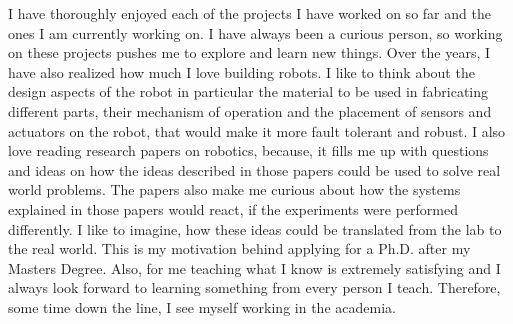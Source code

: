 \documentclass[10pt]{article}
\newcommand{\statement}[1]{\par\medskip
  \textcolor{blue}{\textbf{#1:}}\space
}
\begin{document}
\par
I have thoroughly enjoyed each of the projects I have worked on so far and the ones I am currently working on. I have always been a curious person, so working on these projects pushes me to explore and learn new things. Over the years, I have also realized how much I love building robots. I like to think about the design aspects of the robot in particular the material to be used in fabricating different parts, their mechanism of operation and the placement of sensors and actuators on the robot, that would make it more fault tolerant and robust.  I also love reading research papers on robotics, because, it fills me up with questions and ideas on how the ideas described in those papers could be used to solve real world problems. The papers also make me curious about how the systems explained in those papers would react, if the experiments were performed differently. I like to imagine, how these ideas could be translated from the lab to the real world. This is my motivation behind applying for a Ph.D. after my Masters Degree. Also, for me teaching what I know is extremely satisfying and I always look forward to learning something from every person I teach. Therefore, some time down the line, I see myself working in the academia. 










%
%
\end{document}
